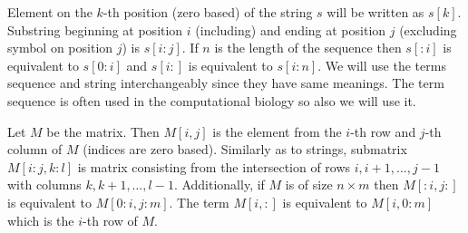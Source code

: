 Element on the $k$-th position (zero based) of the string $s$
will be written as $s[k]$. Substring beginning at position $i$ (including) and
ending at position $j$ (excluding symbol on position $j$) is $s[i:j]$.  If $n$
is the length of the sequence then $s[:i]$ is equivalent to $s[0:i]$ and $s[i:]$
is equivalent to $s[i:n]$.  We will use the terms sequence and string
interchangeably since they have same meanings. The term sequence is often used
in the computational biology so also we will use it.

Let $M$ be the matrix. Then $M[i,j]$ is the element from the $i$-th row and
$j$-th column of $M$ (indices are zero based). Similarly as to strings,
submatrix $M[i:j,k:l]$ is matrix consisting from the intersection of rows
$i,i+1,\dots, j-1$ with columns $k,k+1,\dots,l-1$. Additionally, if $M$ is of
size $n\times m$ then $M[:i,j:]$ is equivalent to $M[0:i,j:m]$.  The term
$M[i,:]$ is equivalent to $M[i,0:m]$ which is the $i$-th row of $M$.
